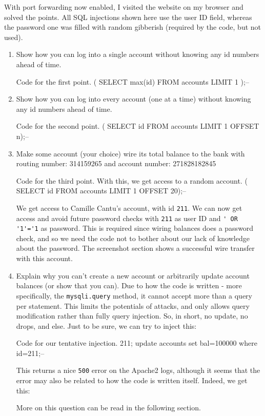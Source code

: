 \documentclass[a4paper,11pt,hidelinks]{article}
\begin{document}
With port forwarding now enabled, I visited the website on my browser and solved the points. All SQL injections shown here use the user ID field, whereas the password one was filled with random gibberish (required by the code, but not used).

\begin{enumerate}
  \item Show how you can log into a single account without knowing any id numbers ahead of time.
  \begin{code}{Code for the first point.}
    ( SELECT max(id) FROM accounts LIMIT 1 );--
  \end{code}
  \item Show how you can log into every account (one at a time) without knowing any id numbers ahead of time.
  \begin{code}{Code for the second point.}
    ( SELECT id FROM accounts LIMIT 1 OFFSET n);--
  \end{code}
  \item Make some account (your choice) wire its total balance to the bank with routing number: 314159265 and account number: 271828182845
  \begin{code}{Code for the third point. With this, we get access to a random account.}
    ( SELECT id FROM accounts LIMIT 1 OFFSET 20);--
  \end{code}
  We get access to Camille Cantu's account, with id \verb=211=. We can now get access and avoid future password checks with \verb=211= as user ID and \verb|' OR '1'='1| as password. This is required since wiring balances does a password check, and so we need the code not to bother about our lack of knowledge about the password. The screenshot section shows a successful wire transfer with this account.
  \item Explain why you can't create a new account or arbitrarily update account balances (or show that you can).
  Due to how the code is written - more specifically, the \verb=mysqli.query= method, it cannot accept more than a query per statement. This limits the potentials of attacks, and only allows query modification rather than fully query injection. So, in short, no update, no drops, and else. Just to be sure, we can try to inject this:
  \begin{code}{Code for our tentative injection.}
    211; update accounts set bal=100000 where id=211;--
  \end{code}
  This returns a nice \verb=500= error on the Apache2 logs, although it seems that the error may also be related to how the code is written itself. Indeed, we get this:
  More on this question can be read in the following section.
\end{enumerate}
\end{document}
